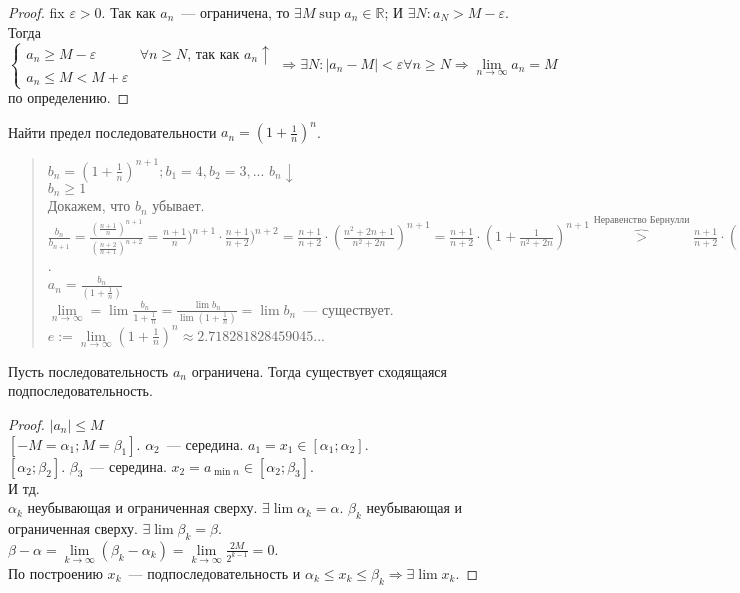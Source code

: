 \documentclass[12pt]{article}
\begin{document}
	\begin{proof}
		fix $\varepsilon > 0$. Так как $a_n$~--- ограничена, то $\exists M  \sup a_n \in \mathbb{R}$; И $\exists N: a_N > M - \varepsilon$. \\
		Тогда $\begin{cases}
			a_n \geqslant M - \varepsilon & \forall n \geqslant N \text{, так как } a_n \uparrow \\
			a_n \leqslant M < M + \varepsilon
		\end{cases} \Rightarrow \exists N: |a_n - M| < \varepsilon \forall n \geqslant N \Rightarrow \lim\limits_{n \rightarrow \infty} a_n = M$ по определению.
	\end{proof}
	\begin{definition}
		Найти предел последовательности $a_n = (1 + \frac{1}{n})^n$.
		\begin{quote}
			$b_n = (1 + \frac{1}{n})^{n + 1}; b_1 = 4, b_2 = 3,...$ $b_n \downarrow$ \\
			$b_n \geqslant 1$ \\
			Докажем, что $b_n$ убывает. \\
			$\frac{b_n}{b_{n + 1}} = \frac{(\frac{n + 1}{n})^{n + 1}}{(\frac{n + 2}{n + 1})^{n + 2}} = \frac{n + 1}{n})^{n + 1} \cdot \frac{n + 1}{n + 2})^{n + 2} = \frac{n + 1}{n + 2} \cdot (\frac{n^2 + 2n + 1}{n^2 + 2n})^{n + 1} = \frac{n + 1}{n + 2} \cdot (1 + \frac{1}{n^2 + 2n})^{n + 1} \overbrace{>}^{\text{Неравенство Бернулли}} \frac{n + 1}{n + 2} \cdot (1 + \frac{n + 1}{n^2 + 2n}) = \frac{(n + 1)(n^2 + 3n + 1)}{(n + 2)(n^2 + 2n)} = \frac{n^3 + 4n^2 + 4n + 1}{n^3 + 4n^2 + 4n} > 1$. \\
			$a_n = \frac{b_n}{(1 + \frac{1}{n})}$ \\
			$\lim\limits_{n \rightarrow \infty} = \lim \frac{b_n}{1 + \frac{1}{n}} = \frac{\lim b_n}{\lim (1 + \frac{1}{n})} = \lim b_n$~--- существует. \\
			$e := \lim\limits_{n \rightarrow \infty} (1 + \frac{1}{n})^n \approx 2.718281828459045...$
		\end{quote}
	\end{definition}
	\begin{theorem}
		Пусть последовательность $a_n$ ограничена. Тогда существует сходящаяся подпоследовательность.
	\end{theorem}
	\begin{proof}
		$|a_n| \leqslant M$ \\
		$[-M = \alpha_1; M = \beta_1]$. $\alpha_2$~--- середина. $a_1 = x_1 \in [\alpha_1; \alpha_2]$. \\
		$[\alpha_2; \beta_2]$. $\beta_3$~--- середина. $x_2 = a_{\min n} \in [\alpha_2; \beta_3]$. \\
		И тд. \\
		${\alpha_k}$ неубывающая и ограниченная сверху. $\exists \lim \alpha_k = \alpha$. ${\beta_k}$ неубывающая и ограниченная сверху. $\exists \lim \beta_k = \beta$. \\
		$\beta - \alpha = \lim \limits_{k \rightarrow \infty} (\beta_k - \alpha_k) = \lim \limits_{k \rightarrow \infty} \frac{2M}{2^{k - 1}} = 0$. \\
		По построению $x_k$~--- подпоследовательность и $\alpha_k \leqslant x_k \leqslant \beta_k \Rightarrow \exists \lim x_k$.
	\end{proof}
\end{document}
